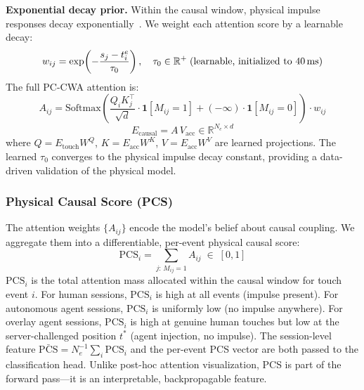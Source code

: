 \noindent\textbf{Exponential decay prior.}
Within the causal window, physical impulse responses decay exponentially~\cite{biomotouch2026}.%
We weight each attention score by a learnable decay:
\begin{equation}
w_{ij} = \exp\!\left(-\frac{s_j - t_i^e}{\tau_0}\right), \quad
\tau_0 \in \mathbb{R}^+\;\text{(learnable, initialized to 40\,ms)}
\label{eq:decay}
\end{equation}
The full PC-CWA attention is:
\begin{equation}
A_{ij} = \mathrm{Softmax}\!\left(
  \frac{Q_i K_j^\top}{\sqrt{d}} \cdot \mathbf{1}[M_{ij}=1] + (-\infty)\cdot\mathbf{1}[M_{ij}=0]
\right) \cdot w_{ij}
\label{eq:pccwa}
\end{equation}
\begin{equation}
E_{\mathrm{causal}} = A\, V_{\mathrm{acc}} \in \mathbb{R}^{N_e \times d}
\label{eq:ecausal}
\end{equation}
where $Q = E_{\mathrm{touch}} W^Q$, $K = E_{\mathrm{acc}} W^K$,
$V = E_{\mathrm{acc}} W^V$ are learned projections.%
The learned $\tau_0$ converges to the physical impulse decay constant, providing
a data-driven validation of the physical model.%

\subsubsection{Physical Causal Score (PCS)}
\label{sec:pcs}

The attention weights $\{A_{ij}\}$ encode the model's belief about causal coupling.%
We aggregate them into a differentiable, per-event physical causal score:
\begin{equation}
\mathrm{PCS}_i = \sum_{j:\,M_{ij}=1} A_{ij} \;\in\; [0,1]
\label{eq:pcs}
\end{equation}
$\mathrm{PCS}_i$ is the total attention mass allocated within the causal window for
touch event $i$.%
For human sessions, $\mathrm{PCS}_i$ is high at all events (impulse present).%
For autonomous agent sessions, $\mathrm{PCS}_i$ is uniformly low (no impulse anywhere).%
For overlay agent sessions, $\mathrm{PCS}_i$ is high at genuine human touches but
low at the server-challenged position $t^*$ (agent injection, no impulse).%
The session-level feature $\bar{\mathrm{PCS}} = N_e^{-1}\sum_i \mathrm{PCS}_i$ and
the per-event PCS vector are both passed to the classification head.%
Unlike post-hoc attention visualization, PCS is part of the forward pass---it is an
interpretable, backpropagable feature.%

